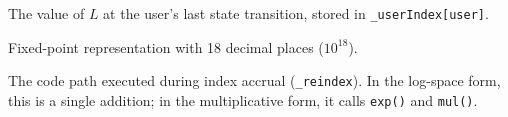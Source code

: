 \documentclass[10pt,a4paper,twocolumn]{article}
\begin{document}
\begin{description}[style=nextline, font=\normalfont\bfseries, leftmargin=1.5em]
\item[User Snapshot ($L_u$)] The value of $L$ at the user's last state transition, stored in \texttt{\_userIndex[user]}.

\item[WAD] Fixed-point representation with 18 decimal places ($10^{18}$).

\item[Write Path] The code path executed during index accrual (\texttt{\_reindex}). In the log-space form, this is a single addition; in the multiplicative form, it calls \texttt{exp()} and \texttt{mul()}.

\end{description}

\clearpage
\ifodd\value{page}\else\thispagestyle{empty}\null\clearpage\fi
\fi
\end{document}
